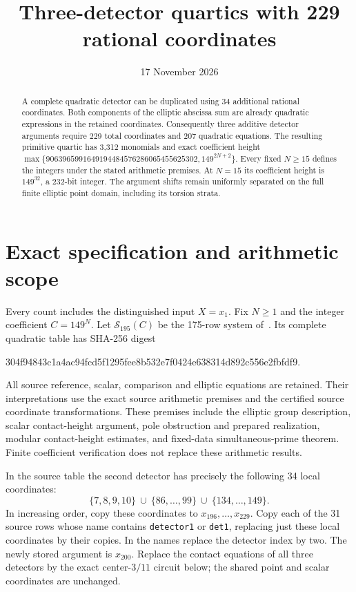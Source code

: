 \documentclass[11pt,a4paper]{article}
\title{Three-detector quartics with 229 rational coordinates}
\author{}\date{17 November 2026}
\begin{document}
\maketitle

\begin{abstract}
A complete quadratic detector can be duplicated using 34 additional
rational coordinates. Both components of the elliptic abscissa sum
are already quadratic expressions in the retained coordinates.
Consequently three additive detector arguments require 229 total
coordinates and 207 quadratic equations. The resulting primitive
quartic has 3,312 monomials and exact coefficient height
$\max\{9063965991649194484576286065455625302,149^{2N+2}\}$.
Every fixed $N\ge15$ defines the integers under the stated arithmetic
premises. At $N=15$ its coefficient height is $149^{32}$, a 232-bit
integer. The argument shifts remain uniformly separated on the full
finite elliptic point domain, including its torsion strata.
\end{abstract}

\section{Exact specification and arithmetic scope}

Every count includes the distinguished input $X=x_1$.
Fix $N\ge1$ and the integer coefficient $C=149^N$.
Let $\mathcal S_{195}(C)$ be the 175-row system of~\cite{Parent195}.
Its complete quadratic table has SHA-256 digest
\begin{center}\small\ttfamily
304f94843c1a4ac94fcd5f1295fee8b532e7f0424e638314d892c556e2fbfdf9.
\end{center}
All source reference, scalar, comparison and elliptic equations are
retained. Their interpretations use the exact source arithmetic
premises and the certified source coordinate transformations.
These premises include the elliptic group description, scalar
contact-height argument, pole obstruction and prepared realization,
modular contact-height estimates, and fixed-data simultaneous-prime
theorem. Finite coefficient verification does not replace these
arithmetic results.

In the source table the second detector has precisely the following
34 local coordinates:
\[
 \{7,8,9,10\}\ \cup\ \{86,\ldots,99\}
 \ \cup\ \{134,\ldots,149\}.
\]
In increasing order, copy these coordinates to
$x_{196},\ldots,x_{229}$. Copy each of the 31 source rows whose
name contains \texttt{detector1} or \texttt{det1}, replacing just
these local coordinates by their copies. In the names replace the
detector index by two. The newly stored argument is $x_{200}$.
Replace the contact equations of all three detectors by the exact
center-$3/11$ circuit below; the shared point and scalar coordinates
are unchanged.
\end{document}
